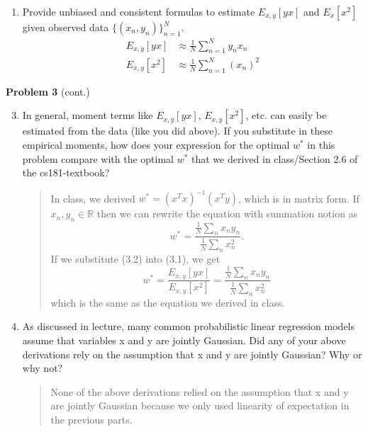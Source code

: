 \documentclass[submit]{harvardml}
\begin{document}
\begin{problem}
\begin{enumerate}
\item Provide unbiased and consistent formulas to estimate $E_{x, y}[yx]$
 and $E_x[x^2]$ given observed data $\{(x_n,y_n)\}_{n=1}^N$.
 \begin{equation*}
   \begin{split}
     E_{x,y}[yx] & \approx \frac{1}{N}\sum_{n=1}^{N}y_n x_n \\
     E_{x,y}[x^2] & \approx \frac{1}{N}\sum_{n=1}^{N} (x_n)^2
   \end{split}
 \end{equation*}
 
\end{enumerate}
\end{problem}

\newpage

\begin{framed}
\noindent\textbf{Problem 3} (cont.)\\
\begin{enumerate}
\setcounter{enumi}{2}

\item In general, moment terms like $E_{x, y}[yx]$, $E_{x, y}[x^2]$,
  etc. can easily be estimated from the data (like you did above).  If
  you substitute in these empirical moments, how does your expression
  for the optimal $w^*$ in this problem compare with the optimal $w^*$
  that we derived in class/Section 2.6 of the cs181-textbook?
  
  \begin{quote}
      In class, we derived $w^{*}=(x^Tx)^{-1}(x^Ty)$, which is in matrix form. If $x_n, y_n\in \mathbb{R}$ then we can rewrite the equation with summation notion as $$w^*=\frac{\frac{1}{N}\sum_n x_ny_n}{\frac{1}{N}\sum_n x_n^2}.$$
      If we substitute (3.2) into (3.1), we get $$w^*=\frac{E_{x,y}[yx]}{E_{x,y}[x^2]}=\frac{\frac{1}{N}\sum_n x_ny_n}{\frac{1}{N}\sum_n x_n^2}$$ which is the same as the equation we derived in class.
  \end{quote}

\item As discussed in lecture, many common probabilistic linear regression models assume that variables x and y are jointly Gaussian.  Did any of your above derivations rely on the assumption that x and y are jointly Gaussian?  Why or why not?
\begin{quote}
    None of the above derivations relied on the assumption that x and y are jointly Gaussian because we only used linearity of expectation in the previous parts.
\end{quote}
    
\end{enumerate}

\end{framed}
\end{document}
